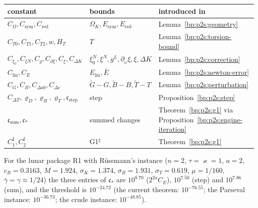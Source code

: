 \begin{remark}\label{bp:p2s:register}
\begin{center}\small
\begin{tabular}{lll}
constant & bounds & introduced in\\\hline
$C_\Omega,C_{\mathrm{sym}},C_{\mathrm{red}}$ & $\Omega_K,E_{\mathrm{sym}},E_{\mathrm{red}}$ & Lemma~\ref{bp:p2s:geometry}\\
$C_{T0},C_{T1},C_{T2},w,H_T$ & $T$ & Lemma~\ref{bp:p2s:torsion-bound}\\
$C_{\xi_0},C_{\xi N},C_g,C_{\partial\xi},C_\xi,C_{\Delta K}$ & $\xi^N_0,\xi^N,g^L,\partial_\omega\xi,\xi,\Delta K$ & Lemma~\ref{bp:p2s:correction}\\
$C_{\mathrm{lin}},C_E$ & $E_{\mathrm{lin}},\bar E$ & Lemma~\ref{bp:p2s:newton-error}\\
$C_G,C_B,C_{\Delta ab},C_{\Delta c}$ & $\tilde G-G,\tilde B-B,\tilde T-T$ & Lemma~\ref{bp:p2s:perturbation}\\
$C_{\Delta T},\varrho_D,\varrho_B,\varrho_T,\mathfrak c_{\mathrm{step}}$ & step & Proposition~\ref{bp:p2s:step}\\
$\mathfrak c_{\mathrm{sum}},\mathfrak c_*$ & summed changes & Theorem~\ref{bp:p2s:g1} via Proposition~\ref{bp:p2s:engine-iteration}\\
$C_1^\sharp,C_2^\sharp$ & G1$^\sharp$ & Theorem~\ref{bp:p2s:g1}
\end{tabular}
\end{center}
For the lunar package R1 with R\"ussmann's instance ($n=2$, $\tau=\varkappa=1$, $a=2$, $c_R=0.3163$, $M=1.924$, $\sigma_K=1.374$,
$\sigma_B=1.931$, $\sigma_T=0.619$, $\mu=1/160$, $\bar\gamma=\gamma\approx1/24$) the three entries of $\mathfrak c_*$ are $10^{8.70}$
($2^{2a}C_E$), $10^{7.50}$ (step) and $10^{7.86}$ (sum), and the threshold is $10^{-24.72}$ (the current theorem: $10^{-76.55}$; the
Parseval instance: $10^{-36.73}$; the crude instance: $10^{-48.85}$).
\end{remark}


